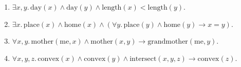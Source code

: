 
\begin{exer}[2.1]
    $ $
    \begin{enumerate}[label=(\alph*)]
        \item
            $\exists x, y.\, \text{day}(x) \land \text{day}(y) \land \text{length}(x) < \text{length}(y)$.
        \item
            $\exists x.\, \text{place}(x) \land \text{home}(x) \land (\forall y.\, \text{place}(y) \land \text{home}(y) \rightarrow x = y)$.
        \item
            $\forall x, y.\, \text{mother}(\text{me}, x) \land \text{mother}(x, y) \rightarrow \text{grandmother}(\text{me}, y)$.
        \item
            $\forall x, y, z.\, \text{convex}(x) \land \text{convex}(y) \land \text{intersect}(x, y, z) \rightarrow \text{convex}(z)$.
    \end{enumerate}
\end{exer}

